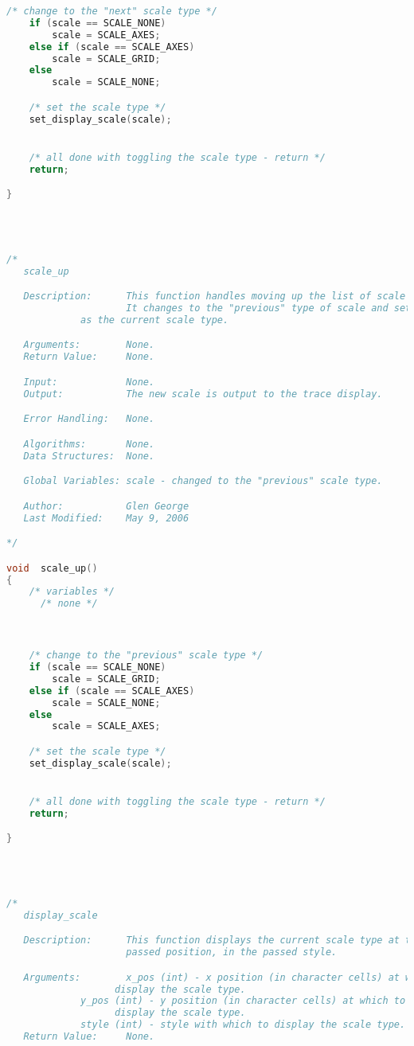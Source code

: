 \begin{lstlisting}[language=C]
    /* change to the "next" scale type */
    if (scale == SCALE_NONE)
        scale = SCALE_AXES;
    else if (scale == SCALE_AXES)
        scale = SCALE_GRID;
    else
        scale = SCALE_NONE;

    /* set the scale type */
    set_display_scale(scale);


    /* all done with toggling the scale type - return */
    return;

}




/*
   scale_up

   Description:      This function handles moving up the list of scale types.
                     It changes to the "previous" type of scale and sets this
   		     as the current scale type.

   Arguments:        None.
   Return Value:     None.

   Input:            None.
   Output:           The new scale is output to the trace display.

   Error Handling:   None.

   Algorithms:       None.
   Data Structures:  None.

   Global Variables: scale - changed to the "previous" scale type.

   Author:           Glen George
   Last Modified:    May 9, 2006

*/

void  scale_up()
{
    /* variables */
      /* none */



    /* change to the "previous" scale type */
    if (scale == SCALE_NONE)
        scale = SCALE_GRID;
    else if (scale == SCALE_AXES)
        scale = SCALE_NONE;
    else
        scale = SCALE_AXES;

    /* set the scale type */
    set_display_scale(scale);


    /* all done with toggling the scale type - return */
    return;

}




/*
   display_scale

   Description:      This function displays the current scale type at the
                     passed position, in the passed style.

   Arguments:        x_pos (int) - x position (in character cells) at which to
   				   display the scale type.
   		     y_pos (int) - y position (in character cells) at which to
   				   display the scale type.
		     style (int) - style with which to display the scale type.
   Return Value:     None.


\end{lstlisting}
